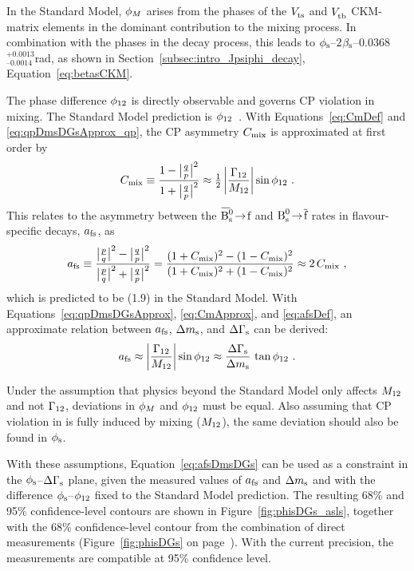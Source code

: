In the Standard Model, $\phi_M$ arises from the phases of the $\Vts$ and $\Vtb$ CKM-matrix elements in the dominant contribution to the
mixing process. In combination with the phases in the \BstoJpsiKK{} decay process, this leads to
$\phi_\text{s}$\textapprox--2$\beta_\text{s}$\texteq--0.0368$^\text{+0.0013}_\text{--0.0014}$\unitsp{}rad, as shown in
Section~\ref{subsec:intro_Jpsiphi_decay}, Equation~\ref{eq:betasCKM}.

The phase difference $\phi_\text{12}$ is directly observable and governs CP violation in mixing. The Standard Model prediction is
$\phi_\text{12}$\unitsp\invps~\cite{Lenz:2006hd,*Lenz:2011ti}. With Equations~\ref{eq:CmDef} and
\ref{eq:qpDmsDGsApprox_qp}, the CP asymmetry $C_\text{mix}$ is approximated at first order by
\begin{equation}
  \label{eq:CmApprox}
  C_\text{mix} \equiv \frac{1-\big|\tfrac{q}{p}\big|^2}{1+\big|\tfrac{q}{p}\big|^2} \approx \tfrac{1}{2}\left|\frac{\Gamma_\text{12}}{M_\text{12}}\right|\sin\phi_\text{12} \ .
\end{equation}
This relates to the asymmetry between the $\Bsbartof$ and $\text{B}_\text{s}^\text{0}\!\to\!\overline{\text{f}}$ rates in flavour-specific decays, $a_\text{fs}$, as
\begin{equation}
  \label{eq:afsDef}
  a_\text{fs} \equiv \frac{\big|\tfrac{p}{q}\big|^2-\big|\tfrac{q}{p}\big|^2}{\big|\tfrac{p}{q}\big|^2+\big|\tfrac{q}{p}\big|^2} = \frac{(1+C_\text{mix})^2 - (1-C_\text{mix})^2}{(1+C_\text{mix})^2 + (1-C_\text{mix})^2} \approx 2\,C_\text{mix}
  \ ,
\end{equation}
which is predicted to be (1.9) in the Standard Model. With Equations~\ref{eq:qpDmsDGsApprox}, \ref{eq:CmApprox},
and \ref{eq:afsDef}, an approximate relation between $a_\text{fs}$, $\Delta m_\text{s}$, and $\Delta\Gamma_\text{s}$ can be derived:
\begin{equation}
  \label{eq:afsDmsDGs}
  a_\text{fs} \approx \left|\frac{\Gamma_\text{12}}{M_\text{12}}\right|\sin\phi_\text{12} \approx \frac{\Delta\Gamma_\text{s}}{\Delta m_\text{s}}\,\tan\phi_\text{12} \ .
\end{equation}

Under the assumption that physics beyond the Standard Model only affects $M_\text{12}$ and not $\Gamma_\text{12}$, deviations in $\phi_M$ and $\phi_\text{12}$ must
be equal. Also assuming that CP violation in \BstoJpsiKK{} is fully induced by mixing ($M_\text{12}$), the same deviation should also be found in
$\phi_\text{s}$.

With these assumptions, Equation~\ref{eq:afsDmsDGs} can be used as a constraint in the $\phi_\text{s}$--$\Delta\Gamma_\text{s}$ plane, given the measured
values of $a_\text{fs}$ and $\Delta m_\text{s}$ and with the difference $\phi_\text{s}$--$\phi_\text{12}$ fixed to the Standard Model prediction. The resulting 68\% and 95\%
confidence-level contours are shown in Figure~\ref{fig:phisDGs_asls}, together with the 68\% confidence-level contour from the combination
of direct measurements (Figure~\ref{fig:phisDGs} on page~\pageref{fig:phisDGs}). With the current precision, the measurements are
compatible at 95\% confidence level.

